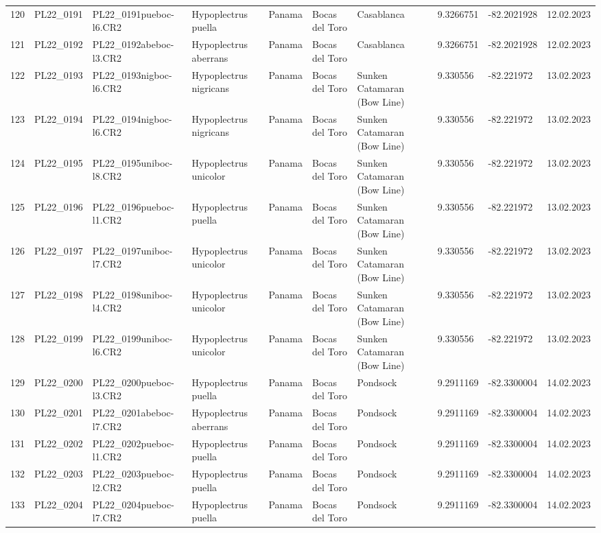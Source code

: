 \begin{table}[ht]
\begin{tabular}{rlllllllll}
  120 & PL22\_0191 & PL22\_0191pueboc-l6.CR2 & Hypoplectrus puella & Panama & Bocas del Toro & Casablanca & 9.3266751 & -82.2021928 & 12.02.2023 \\ 
  121 & PL22\_0192 & PL22\_0192abeboc-l3.CR2 & Hypoplectrus aberrans & Panama & Bocas del Toro & Casablanca & 9.3266751 & -82.2021928 & 12.02.2023 \\ 
  122 & PL22\_0193 & PL22\_0193nigboc-l6.CR2 & Hypoplectrus nigricans  & Panama & Bocas del Toro & Sunken Catamaran (Bow Line) & 9.330556 & -82.221972 & 13.02.2023 \\ 
  123 & PL22\_0194 & PL22\_0194nigboc-l6.CR2 & Hypoplectrus nigricans  & Panama & Bocas del Toro & Sunken Catamaran (Bow Line) & 9.330556 & -82.221972 & 13.02.2023 \\ 
  124 & PL22\_0195 & PL22\_0195uniboc-l8.CR2 & Hypoplectrus unicolor & Panama & Bocas del Toro & Sunken Catamaran (Bow Line) & 9.330556 & -82.221972 & 13.02.2023 \\ 
  125 & PL22\_0196 & PL22\_0196pueboc-l1.CR2 & Hypoplectrus puella & Panama & Bocas del Toro & Sunken Catamaran (Bow Line) & 9.330556 & -82.221972 & 13.02.2023 \\ 
  126 & PL22\_0197 & PL22\_0197uniboc-l7.CR2 & Hypoplectrus unicolor & Panama & Bocas del Toro & Sunken Catamaran (Bow Line) & 9.330556 & -82.221972 & 13.02.2023 \\ 
  127 & PL22\_0198 & PL22\_0198uniboc-l4.CR2 & Hypoplectrus unicolor & Panama & Bocas del Toro & Sunken Catamaran (Bow Line) & 9.330556 & -82.221972 & 13.02.2023 \\ 
  128 & PL22\_0199 & PL22\_0199uniboc-l6.CR2 & Hypoplectrus unicolor & Panama & Bocas del Toro & Sunken Catamaran (Bow Line) & 9.330556 & -82.221972 & 13.02.2023 \\ 
  129 & PL22\_0200 & PL22\_0200pueboc-l3.CR2 & Hypoplectrus puella & Panama & Bocas del Toro & Pondsock & 9.2911169 & -82.3300004 & 14.02.2023 \\ 
  130 & PL22\_0201 & PL22\_0201abeboc-l7.CR2 & Hypoplectrus aberrans & Panama & Bocas del Toro & Pondsock & 9.2911169 & -82.3300004 & 14.02.2023 \\ 
  131 & PL22\_0202 & PL22\_0202pueboc-l1.CR2 & Hypoplectrus puella & Panama & Bocas del Toro & Pondsock & 9.2911169 & -82.3300004 & 14.02.2023 \\ 
  132 & PL22\_0203 & PL22\_0203pueboc-l2.CR2 & Hypoplectrus puella & Panama & Bocas del Toro & Pondsock & 9.2911169 & -82.3300004 & 14.02.2023 \\ 
  133 & PL22\_0204 & PL22\_0204pueboc-l7.CR2 & Hypoplectrus puella & Panama & Bocas del Toro & Pondsock & 9.2911169 & -82.3300004 & 14.02.2023 \\ 

\end{tabular}
\end{table}
